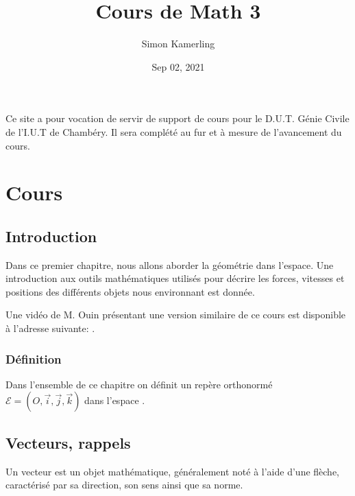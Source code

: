 \documentclass[letterpaper,10pt,english]{jupyterBook}
\title{Cours de Math 3}
\date{Sep 02, 2021}
\author{Simon Kamerling}
\begin{document}
\pagestyle{empty}
\sphinxmaketitle
\pagestyle{plain}
\sphinxtableofcontents
\pagestyle{normal}
\label{\detokenize{intro::doc}}


\sphinxAtStartPar
Ce site a pour vocation de servir de support de cours pour le D.U.T. Génie Civile de l’I.U.T de Chambéry. Il sera complété au fur et à mesure de l’avancement du cours.


\chapter{Cours}
\label{\detokenize{Part1/Cours:cours}}\label{\detokenize{Part1/Cours::doc}}

\section{Introduction}
\label{\detokenize{Part1/Cours:introduction}}
\sphinxAtStartPar
Dans ce premier chapitre, nous allons aborder la géométrie dans l’espace. Une introduction aux outils mathématiques utilisés pour décrire les forces, vitesses et positions des différents objets nous environnant est donnée.

\sphinxAtStartPar
Une vidéo de M. Ouin présentant une version similaire de ce cours est disponible à l’adresse suivante:  .


\subsection{Définition}
\label{\detokenize{Part1/Cours:definition}}
\sphinxAtStartPar
Dans l’ensemble de ce chapitre on définit un repère orthonormé \(\mathcal{E} = (O,\vec{i},\vec{j},\vec{k})\) dans l’espace .


\section{Vecteurs, rappels}
\label{\detokenize{Part1/Cours:vecteurs-rappels}}
\sphinxAtStartPar
{} Un vecteur est un objet mathématique, généralement noté à l’aide d’une flèche, caractérisé par sa direction, son sens ainsi que sa norme.
\end{document}
